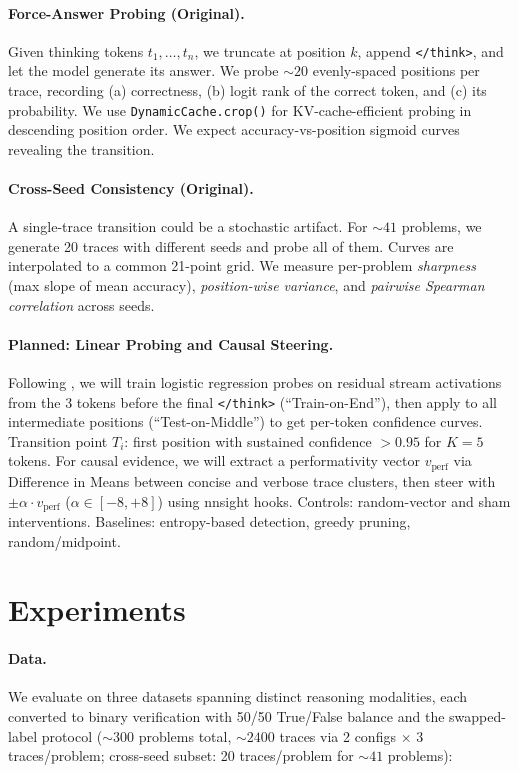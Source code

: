 \documentclass[11pt]{article}
\begin{document}
\paragraph{Force-Answer Probing (Original).}
Given thinking tokens $t_1, \ldots, t_n$, we truncate at position $k$, append \texttt{</think>}, and let the model generate its answer. We probe ${\sim}20$ evenly-spaced positions per trace, recording (a) correctness, (b) logit rank of the correct token, and (c) its probability. We use \texttt{DynamicCache.crop()} for KV-cache-efficient probing in descending position order. We expect accuracy-vs-position sigmoid curves revealing the transition.

\paragraph{Cross-Seed Consistency (Original).}
A single-trace transition could be a stochastic artifact. For ${\sim}41$ problems, we generate 20 traces with different seeds and probe all of them. Curves are interpolated to a common 21-point grid. We measure per-problem \emph{sharpness} (max slope of mean accuracy), \emph{position-wise variance}, and \emph{pairwise Spearman correlation} across seeds.

\paragraph{Planned: Linear Probing and Causal Steering.}
Following \citet{cox2025posthoc}, we will train logistic regression probes on residual stream activations from the 3 tokens before the final \texttt{</think>} (``Train-on-End''), then apply to all intermediate positions (``Test-on-Middle'') to get per-token confidence curves. Transition point $T_i$: first position with sustained confidence $>0.95$ for $K{=}5$ tokens. For causal evidence, we will extract a performativity vector $v_{\text{perf}}$ via Difference in Means between concise and verbose trace clusters, then steer with $\pm\alpha \cdot v_{\text{perf}}$ ($\alpha \in [-8, +8]$) using nnsight \citep{nnsight} hooks. Controls: random-vector and sham interventions. Baselines: entropy-based detection, greedy pruning, random/midpoint.

\section{Experiments}

\paragraph{Data.}
We evaluate on three datasets spanning distinct reasoning modalities, each converted to binary verification with 50/50 True/False balance and the swapped-label protocol (${\sim}300$ problems total, ${\sim}2400$ traces via 2 configs $\times$ 3 traces/problem; cross-seed subset: 20 traces/problem for ${\sim}41$ problems):
\end{document}
